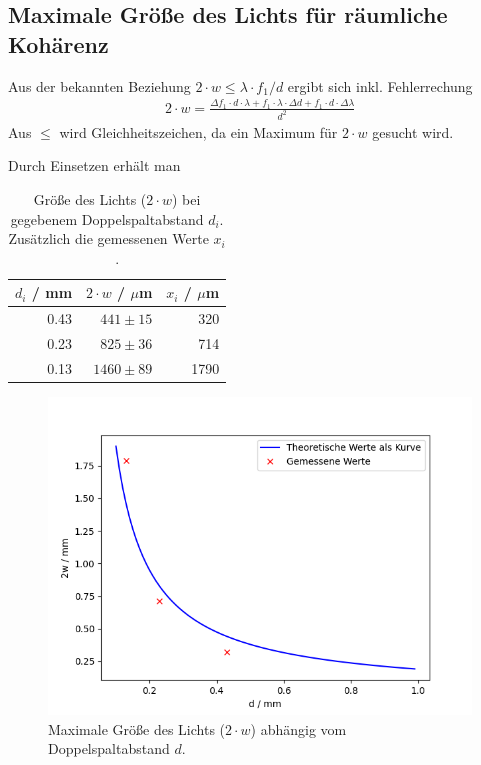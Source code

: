 \documentclass{article}
\begin{document}
\subsection{Maximale Größe des Lichts für räumliche Kohärenz}


Aus der bekannten Beziehung $2\cdot w \le \lambda\cdot f_1 /d$ ergibt sich inkl. Fehlerrechung
\begin{align*}
2\cdot w = \frac{\Delta f_1 \cdot d \cdot \lambda + f_1\cdot\lambda\cdot \Delta d + f_1\cdot d\cdot \Delta \lambda }{d^2}
\end{align*}
Aus $\le$ wird Gleichheitszeichen, da ein Maximum für $2\cdot w$ gesucht wird.


Durch Einsetzen erhält man
\begin{table}[H]
\caption{Größe des Lichts ($2\cdot w$) bei gegebenem Doppelspaltabstand $d_i$. Zusätzlich die gemessenen Werte $x_i$.}
\label{tab:task4}
\begin{tabular}{r|rr}
$d_i$ / mm & $2\cdot w$ / $\mu$m & $x_i$ / $\mu$m \\
\hline
0.43 & $441 \pm 15$ & 320 \\
0.23 & $825 \pm 36$ & 714\\
0.13 & $1460 \pm 89$ & 1790
\end{tabular}

\end{table}


\begin{figure}[H]
\centering
\caption{Maximale Größe des Lichts ($2\cdot w$) abhängig vom Doppelspaltabstand $d$.}
\label{fig:task4}
\includegraphics[scale=0.7]{task4.png}
\end{figure}
\end{document}
